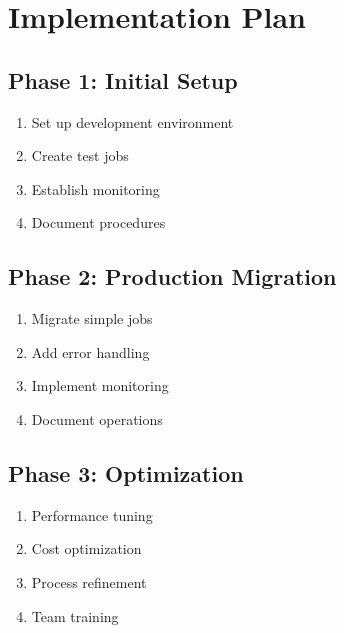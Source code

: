 \documentclass[
  letterpaper,
  DIV=11,
  numbers=noendperiod]{scrartcl}
\providecommand{\tightlist}{%
  \setlength{\itemsep}{0pt}\setlength{\parskip}{0pt}}\usepackage{longtable,booktabs,array}
\begin{document}
\section{Implementation Plan}\label{implementation-plan}

\subsection{Phase 1: Initial Setup}\label{phase-1-initial-setup}

\begin{enumerate}
\def\labelenumi{\arabic{enumi}.}
\tightlist
\item
  Set up development environment
\item
  Create test jobs
\item
  Establish monitoring
\item
  Document procedures
\end{enumerate}

\subsection{Phase 2: Production
Migration}\label{phase-2-production-migration}

\begin{enumerate}
\def\labelenumi{\arabic{enumi}.}
\tightlist
\item
  Migrate simple jobs
\item
  Add error handling
\item
  Implement monitoring
\item
  Document operations
\end{enumerate}

\subsection{Phase 3: Optimization}\label{phase-3-optimization}

\begin{enumerate}
\def\labelenumi{\arabic{enumi}.}
\tightlist
\item
  Performance tuning
\item
  Cost optimization
\item
  Process refinement
\item
  Team training
\end{enumerate}
\end{document}
